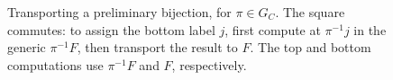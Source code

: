 \begin{figure}[htbp]
\centering
{}
\caption{Transporting a preliminary bijection, for $\pi\in G_C$.
The square commutes: to assign the bottom label $j$, first compute
at $\pi^{-1}j$ in the generic $\pi^{-1}F$, then transport the result
to $F$. The top and bottom computations use $\pi^{-1}F$ and $F$,
respectively.}
\label{fig:moved-generic-transport}
\end{figure}
